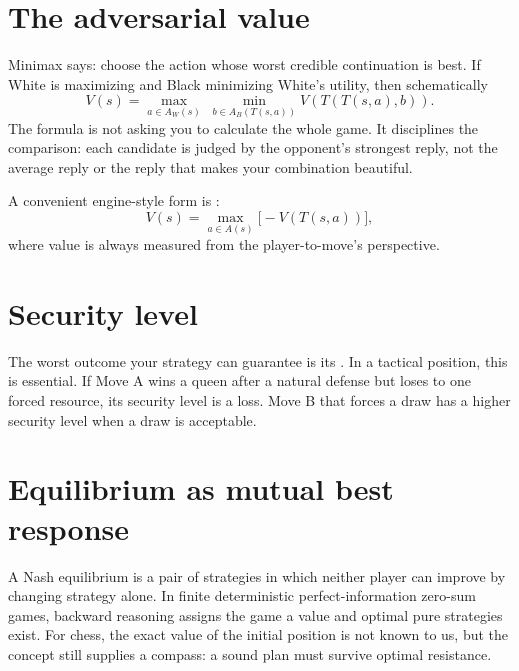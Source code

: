 \section{The adversarial value}
Minimax says: choose the action whose worst credible continuation is best. If White is maximizing and Black minimizing White's utility, then schematically
\[
V(s)=\max_{a\in A_W(s)}\;\min_{b\in A_B(T(s,a))}V(T(T(s,a),b)).
\]
The formula is not asking you to calculate the whole game. It disciplines the comparison: each candidate is judged by the opponent's strongest reply, not the average reply or the reply that makes your combination beautiful.

A convenient engine-style form is :
\[
V(s)=\max_{a\in A(s)}\bigl[-V(T(s,a))\bigr],
\]
where value is always measured from the player-to-move's perspective.

\section{Security level}
The worst outcome your strategy can guarantee is its . In a tactical position, this is essential. If Move A wins a queen after a natural defense but loses to one forced resource, its security level is a loss. Move B that forces a draw has a higher security level when a draw is acceptable.

\begin{center}
\end{center}

\section{Equilibrium as mutual best response}
A Nash equilibrium is a pair of strategies in which neither player can improve by changing strategy alone. In finite deterministic perfect-information zero-sum games, backward reasoning assigns the game a value and optimal pure strategies exist. For chess, the exact value of the initial position is not known to us, but the concept still supplies a compass: a sound plan must survive optimal resistance.

